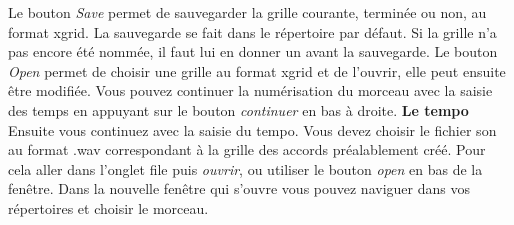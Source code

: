 \documentclass[a4paper]{article}
\begin{document}
Le bouton \textit{Save} permet de sauvegarder la grille courante, terminée ou non, au format xgrid. 
La sauvegarde se fait dans le répertoire par défaut. 
Si la grille n'a pas encore été nommée, il faut lui en donner un avant la sauvegarde.
Le bouton \textit{Open} permet de choisir une grille au format xgrid et de l'ouvrir, elle peut ensuite être modifiée.
Vous pouvez continuer la numérisation du morceau avec la saisie des temps en appuyant sur le bouton \textit{continuer} en bas à droite.
\newpage 
\textbf{Le tempo}\\
Ensuite vous continuez avec la saisie du tempo. 
Vous devez choisir le fichier son au format .wav correspondant à la grille des accords préalablement créé. 
Pour cela aller dans l'onglet file puis \textit{ouvrir}, ou utiliser le bouton \textit{open} en bas de la fenêtre. 
Dans la nouvelle fenêtre qui s'ouvre vous pouvez naviguer dans vos répertoires et choisir le morceau.\\
\end{document}
